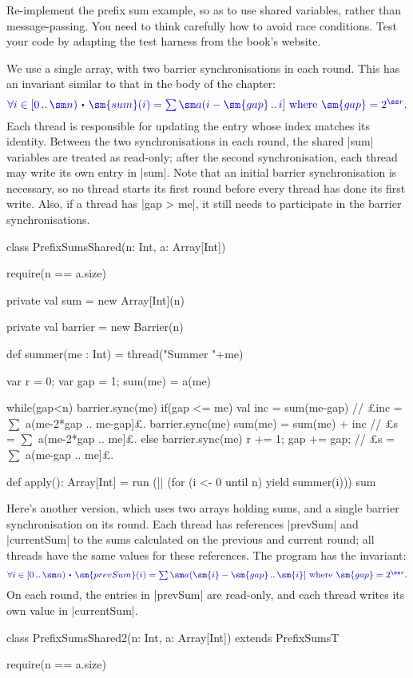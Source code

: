 \begin{question}
\label{ex:prefix-sums-shared}
Re-implement the prefix sum example, so as to use shared variables, rather
than message-passing.  You need to think carefully how to avoid race
conditions.  
%
Test your code by adapting the test harness from the book's website.
\end{question}


\begin{answerI}
We use a single array, with two barrier synchronisations in each round.  This
has an invariant similar to that in the body of the chapter:
\[\mstyle
\forall i \in \interval{0}{\sm n} \spot
  \sm{sum}(i) = \textstyle\sum \sm a(i-\sm{gap} \upto i]
   \mbox{ where } \sm{gap} = 2^{\ss r} .
\]
Each thread is responsible for updating the entry whose index matches its
identity.  Between the two synchronisations in each round, the shared |sum|
variables are treated as read-only; after the second synchronisation, each
thread may write its own entry in |sum|.  Note that an initial barrier
synchronisation is necessary, so no thread starts its first round before every
thread has done its first write.  Also, if a thread has |gap > me|, it still
needs to participate in the barrier synchronisations.
%
\begin{scala}
class PrefixSumsShared(n: Int, a: Array[Int]){
  require(n == a.size)

  private val sum = new Array[Int](n) 

  private val barrier = new Barrier(n)

  def summer(me : Int) = thread("Summer "+me){    
    var r = 0; var gap = 1; sum(me) = a(me)

    while(gap<n){ 
      barrier.sync(me)
      if(gap <= me){                
        val inc = sum(me-gap)    // £inc = $\sum$ a(me-2*gap .. me-gap]£.
        barrier.sync(me)
        sum(me) = sum(me) + inc  // £s = $\sum$ a(me-2*gap .. me]£.
      }
      else barrier.sync(me)
      r += 1; gap += gap;        // £s = $\sum$ a(me-gap .. me]£.
    }
  }

  def apply(): Array[Int] = {
    run (|| (for (i <- 0 until n) yield summer(i)))
    sum
  }
}
\end{scala}


Here's another version, which uses two arrays holding sums, and a single
barrier synchronisation on its round.  Each thread has references |prevSum|
and |currentSum| to the sums calculated on the previous and current round; all
threads have the same values for these references.  The program has the
invariant: 
\[\mstyle
\forall i \in \interval{0}{\sm n} \spot
  \sm{prevSum}(i) = \textstyle\sum \sm a(\sm{i}-\sm{gap} \upto \sm{i}]
   \mbox{ where } \sm{gap} = 2^{\ss r} .
\]
On each round, the entries in |prevSum| are read-only, and each thread writes
its own value in |currentSum|.
%
\begin{scala}
class PrefixSumsShared2(n: Int, a: Array[Int]) extends PrefixSumsT{
  require(n == a.size)

}
\end{scala}
\end{answerI}
